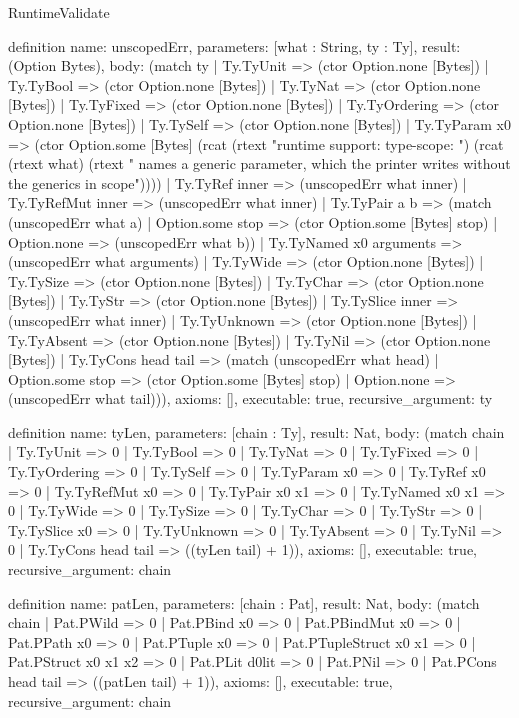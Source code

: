 \begin{lexlean}{RuntimeValidate}
\begin{semanticmodule}
definition{
  name: unscopedErr,
  parameters: [what : String, ty : Ty],
  result: (Option Bytes),
  body: (match ty
    | Ty.TyUnit => (ctor Option.none [Bytes])
    | Ty.TyBool => (ctor Option.none [Bytes])
    | Ty.TyNat => (ctor Option.none [Bytes])
    | Ty.TyFixed => (ctor Option.none [Bytes])
    | Ty.TyOrdering => (ctor Option.none [Bytes])
    | Ty.TySelf => (ctor Option.none [Bytes])
    | Ty.TyParam x0 => (ctor Option.some [Bytes] (rcat (rtext "runtime support: type-scope: ") (rcat (rtext what) (rtext " names a generic parameter, which the printer writes without the generics in scope"))))
    | Ty.TyRef inner => (unscopedErr what inner)
    | Ty.TyRefMut inner => (unscopedErr what inner)
    | Ty.TyPair a b => (match (unscopedErr what a)
      | Option.some stop => (ctor Option.some [Bytes] stop)
      | Option.none => (unscopedErr what b))
    | Ty.TyNamed x0 arguments => (unscopedErr what arguments)
    | Ty.TyWide => (ctor Option.none [Bytes])
    | Ty.TySize => (ctor Option.none [Bytes])
    | Ty.TyChar => (ctor Option.none [Bytes])
    | Ty.TyStr => (ctor Option.none [Bytes])
    | Ty.TySlice inner => (unscopedErr what inner)
    | Ty.TyUnknown => (ctor Option.none [Bytes])
    | Ty.TyAbsent => (ctor Option.none [Bytes])
    | Ty.TyNil => (ctor Option.none [Bytes])
    | Ty.TyCons head tail => (match (unscopedErr what head)
      | Option.some stop => (ctor Option.some [Bytes] stop)
      | Option.none => (unscopedErr what tail))),
  axioms: [],
  executable: true,
  recursive_argument: ty
}

definition{
  name: tyLen,
  parameters: [chain : Ty],
  result: Nat,
  body: (match chain
    | Ty.TyUnit => 0
    | Ty.TyBool => 0
    | Ty.TyNat => 0
    | Ty.TyFixed => 0
    | Ty.TyOrdering => 0
    | Ty.TySelf => 0
    | Ty.TyParam x0 => 0
    | Ty.TyRef x0 => 0
    | Ty.TyRefMut x0 => 0
    | Ty.TyPair x0 x1 => 0
    | Ty.TyNamed x0 x1 => 0
    | Ty.TyWide => 0
    | Ty.TySize => 0
    | Ty.TyChar => 0
    | Ty.TyStr => 0
    | Ty.TySlice x0 => 0
    | Ty.TyUnknown => 0
    | Ty.TyAbsent => 0
    | Ty.TyNil => 0
    | Ty.TyCons head tail => ((tyLen tail) + 1)),
  axioms: [],
  executable: true,
  recursive_argument: chain
}

definition{
  name: patLen,
  parameters: [chain : Pat],
  result: Nat,
  body: (match chain
    | Pat.PWild => 0
    | Pat.PBind x0 => 0
    | Pat.PBindMut x0 => 0
    | Pat.PPath x0 => 0
    | Pat.PTuple x0 => 0
    | Pat.PTupleStruct x0 x1 => 0
    | Pat.PStruct x0 x1 x2 => 0
    | Pat.PLit d0lit => 0
    | Pat.PNil => 0
    | Pat.PCons head tail => ((patLen tail) + 1)),
  axioms: [],
  executable: true,
  recursive_argument: chain
}


\end{semanticmodule}
\end{lexlean}
